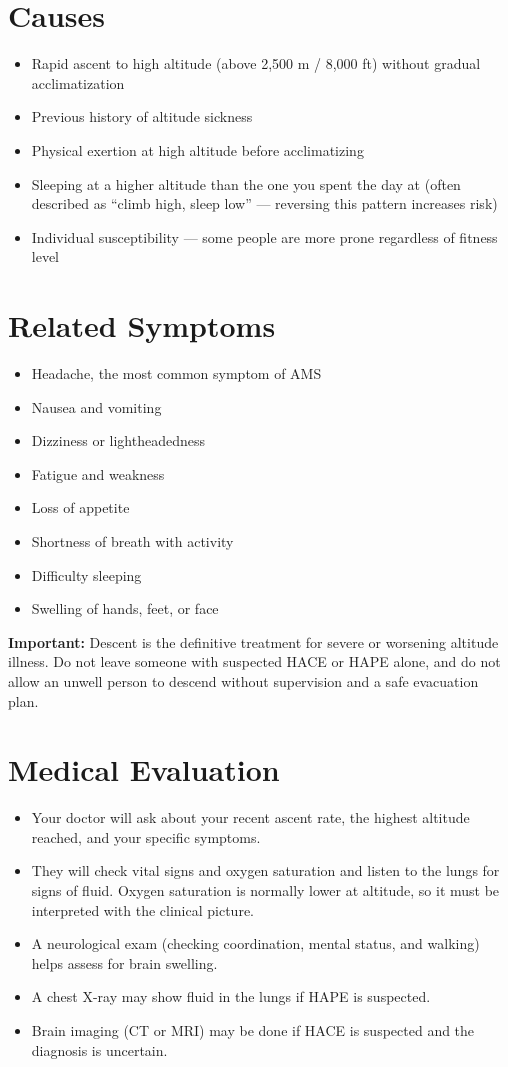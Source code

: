 \section*{Causes}
\begin{itemize}
  \item Rapid ascent to high altitude (above 2,500 m / 8,000 ft) without gradual acclimatization
  \item Previous history of altitude sickness
  \item Physical exertion at high altitude before acclimatizing
  \item Sleeping at a higher altitude than the one you spent the day at (often described as ``climb high, sleep low'' — reversing this pattern increases risk)
  \item Individual susceptibility — some people are more prone regardless of fitness level
\end{itemize}

\section*{Related Symptoms}
\begin{itemize}
  \item Headache, the most common symptom of AMS
  \item Nausea and vomiting
  \item Dizziness or lightheadedness
  \item Fatigue and weakness
  \item Loss of appetite
  \item Shortness of breath with activity
  \item Difficulty sleeping
  \item Swelling of hands, feet, or face
\end{itemize}
\textbf{Important:} Descent is the definitive treatment for severe or worsening altitude illness. Do not leave someone with suspected HACE or HAPE alone, and do not allow an unwell person to descend without supervision and a safe evacuation plan.

\section*{Medical Evaluation}
\begin{itemize}
  \item Your doctor will ask about your recent ascent rate, the highest altitude reached, and your specific symptoms.
  \item They will check vital signs and oxygen saturation and listen to the lungs for signs of fluid. Oxygen saturation is normally lower at altitude, so it must be interpreted with the clinical picture.
  \item A neurological exam (checking coordination, mental status, and walking) helps assess for brain swelling.
  \item A chest X-ray may show fluid in the lungs if HAPE is suspected.
  \item Brain imaging (CT or MRI) may be done if HACE is suspected and the diagnosis is uncertain.
\end{itemize}

